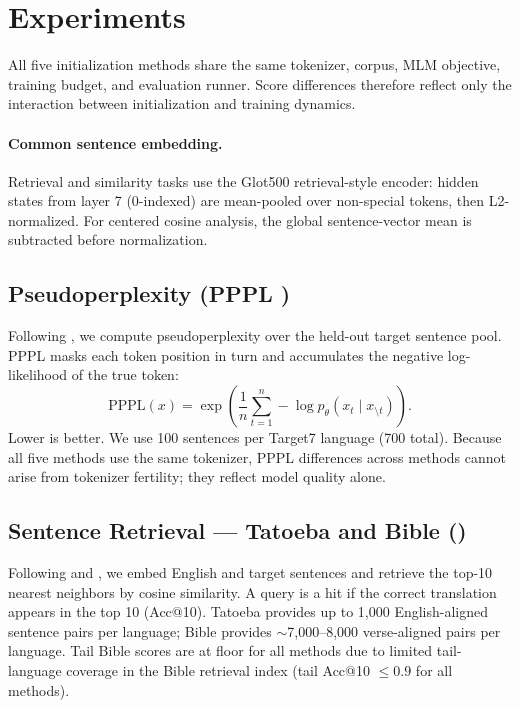 \section{Experiments}

All five initialization methods share the same tokenizer, corpus, MLM objective, training budget,
and evaluation runner.
Score differences therefore reflect only the interaction between initialization and
training dynamics.

\paragraph{Common sentence embedding.}
Retrieval and similarity tasks use the Glot500 retrieval-style encoder:
hidden states from layer 7 (0-indexed) are mean-pooled over non-special tokens,
then L2-normalized.
For centered cosine analysis, the global sentence-vector mean is subtracted before normalization.

\subsection{Pseudoperplexity (PPPL \dn)}

Following \citet{salazar2020pppl}, we compute pseudoperplexity over the held-out target
sentence pool.
PPPL masks each token position in turn and accumulates the negative log-likelihood of
the true token:
\[
\mathrm{PPPL}(x) = \exp\!\left(\frac{1}{n}\sum_{t=1}^{n} -\log p_\theta(x_t \mid x_{\setminus t})\right).
\]
Lower is better.
We use 100 sentences per Target7 language (700 total).
Because all five methods use the same tokenizer, PPPL differences across methods
cannot arise from tokenizer fertility; they reflect model quality alone.

\subsection{Sentence Retrieval --- Tatoeba and Bible (\up)}

Following \citet{hu2020xtreme} and \citet{artetxe2019tatoeba}, we embed English and target
sentences and retrieve the top-10 nearest neighbors by cosine similarity.
A query is a hit if the correct translation appears in the top 10 (Acc@10).
Tatoeba provides up to 1,000 English-aligned sentence pairs per language;
Bible provides $\sim$7,000--8,000 verse-aligned pairs per language.
Tail Bible scores are at floor for all methods due to limited tail-language coverage
in the Bible retrieval index (tail Acc@10 $\leq 0.9$ for all methods).

